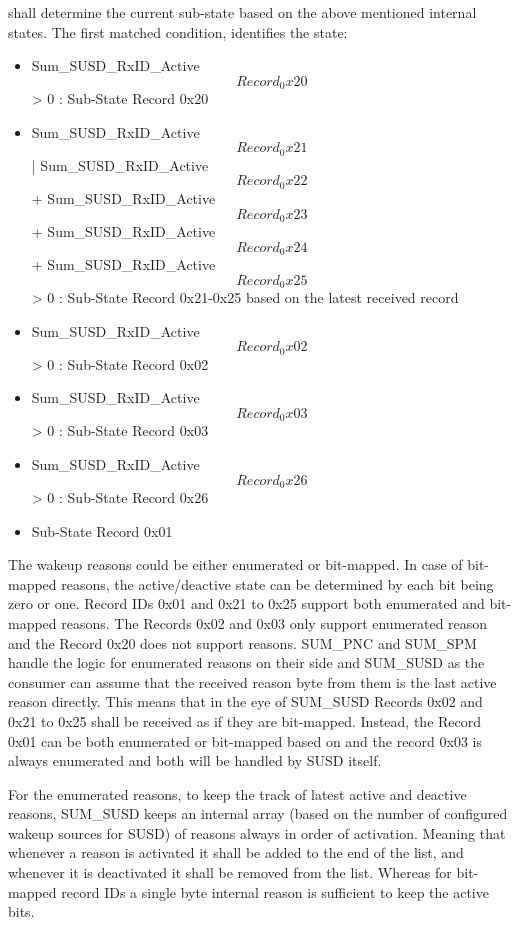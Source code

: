 { shall determine the current sub-state  based on the above mentioned internal states. The first matched condition, identifies the state:
\begin{itemize}
	\item Sum_SUSD_RxID_Active\[Record_0x20\] > 0 : Sub-State Record 0x20
	\item Sum_SUSD_RxID_Active\[Record_0x21\] | Sum_SUSD_RxID_Active\[Record_0x22\] + Sum_SUSD_RxID_Active\[Record_0x23\] + Sum_SUSD_RxID_Active\[Record_0x24\] + Sum_SUSD_RxID_Active\[Record_0x25\] > 0 : Sub-State Record 0x21-0x25 based on the latest received record
	\item Sum_SUSD_RxID_Active\[Record_0x02\] > 0 : Sub-State Record 0x02
	\item Sum_SUSD_RxID_Active\[Record_0x03\] > 0 : Sub-State Record 0x03
	\item Sum_SUSD_RxID_Active\[Record_0x26\] > 0 : Sub-State Record 0x26
	\item Sub-State Record 0x01
\end{itemize}
}
{}

{The wakeup reasons could be either enumerated or bit-mapped. In case of bit-mapped reasons, the active/deactive state can be determined by each bit being zero or one. 
Record IDs 0x01 and 0x21 to 0x25 support both enumerated and bit-mapped reasons. 
The Records 0x02 and 0x03 only support enumerated reason and the Record 0x20 does not support reasons. 
SUM_PNC and SUM_SPM handle the logic for enumerated reasons on their side and SUM_SUSD as the consumer can assume that the received reason byte from them is the last active reason directly.
This means that in the eye of SUM_SUSD Records 0x02 and 0x21 to 0x25 shall be received as if they are bit-mapped.
Instead, the Record 0x01 can be both enumerated or bit-mapped based on  and the record 0x03 is always enumerated and both will be handled by SUSD itself.  
}
{ }

{For the enumerated reasons, to keep the track of latest active and deactive reasons, SUM_SUSD keeps an internal array (based on the number of configured wakeup sources for SUSD) of reasons always in order of activation. 
Meaning that whenever a reason is activated it shall be added to the end of the list, and whenever it is deactivated it shall be removed from the list. 
Whereas for bit-mapped record IDs a single byte internal reason is sufficient to keep the active bits.}
{ }




